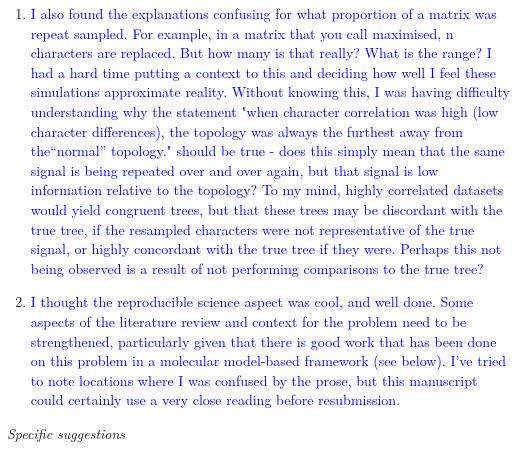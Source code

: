 \documentclass[12pt,letterpaper]{article}
\renewcommand{\subsection}[1]{%
\bigskip
\begin{center}
\begin{large}
\normalfont\itshape #1
\end{large}
\end{center}}
\begin{document}
\begin{enumerate}
\item{\textcolor{blue}{I also found the explanations confusing for what proportion of a matrix was repeat sampled. For example, in a matrix that you call maximised, n characters are replaced. But how many is that really? What is the range? I had a hard time putting a context to this and deciding how well I feel these simulations approximate reality.  Without knowing this, I was having difficulty understanding why the statement "when character correlation was high (low character differences), the topology was always the furthest away from the``normal'' topology." 
should be true - does this simply mean that the same signal is being repeated over and over again, but that signal is low information relative to the topology? To my mind, highly correlated datasets would yield congruent trees, but that these trees may be discordant with the true tree, if the resampled characters were not representative of the true signal, or highly concordant with the true tree if they were. Perhaps this not being observed is a result of not performing comparisons to the true tree?}}


\item{\textcolor{blue}{I thought the reproducible science aspect was cool, and well done. Some aspects of the literature review and context for the problem need to be strengthened, particularly given that there is good work that has been done on this problem in a molecular model-based framework (see below). I've tried to note locations where I was confused by the prose, but this manuscript could certainly use a very close reading before resubmission.}}

\end{enumerate}

\subsection{Specific suggestions}
\end{document}
